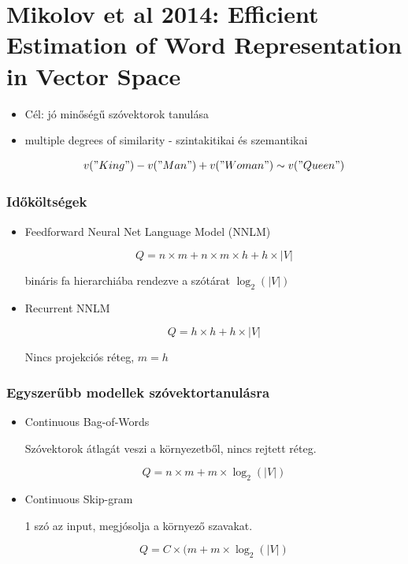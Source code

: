 \documentclass{beamer}
\begin{document}
\section{Mikolov et al 2014: Efficient Estimation of Word Representation in Vector Space}
\begin{frame}
\begin{itemize}
\item Cél: jó minőségű szóvektorok tanulása

\item multiple degrees of similarity - szintakitikai és szemantikai

\[ v("King") - v("Man") + v("Woman") \sim v("Queen") \]
\end{itemize}

\end{frame}

\begin{frame}
\frametitle{Időköltségek}

\begin{itemize}
\item Feedforward Neural Net Language Model (NNLM)

\[ Q = n \times m + n \times m \times h + h \times |V| \]

bináris fa hierarchiába rendezve a szótárat \(\log_2(|V|)\)

\item Recurrent NNLM

\[ Q = h \times h + h \times |V| \]

Nincs projekciós réteg, \(m=h\)
\end{itemize}

\end{frame}

\begin{frame}
\frametitle{Egyszerűbb modellek szóvektortanulásra}

\begin{itemize}
\item Continuous Bag-of-Words

Szóvektorok átlagát veszi a környezetből, nincs rejtett réteg.

\[ Q = n \times m + m \times \log_2(|V|) \]

\item Continuous Skip-gram

1 szó az input, megjósolja a környező szavakat.

\[ Q = C \times (m + m \times \log_2(|V|) \]

\end{itemize}

\end{frame}
\end{document}
